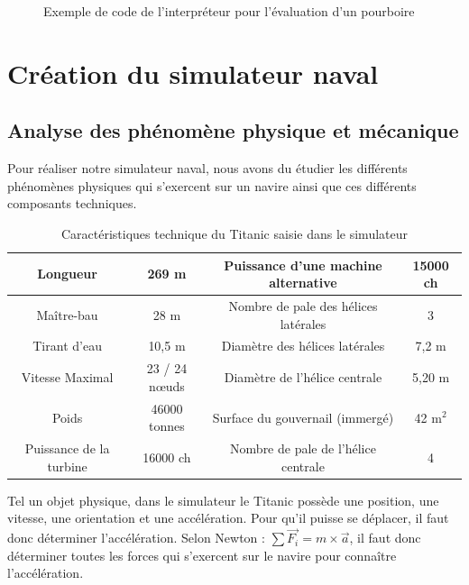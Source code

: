 \documentclass[a4paper,11pt]{article}
\begin{document}
    \begin{figure}[H]
        \begin{center}
            \caption{Exemple de code de l’interpréteur pour l’évaluation d'un pourboire}
            
            \label{fig:codeExemple}
        \end{center}
    \end{figure}

    \section{Création du simulateur naval}

    \subsection{Analyse des phénomène physique et mécanique}

    Pour réaliser notre simulateur naval, nous avons du étudier les différents phénomènes physiques qui s'exercent sur un navire ainsi que ces différents composants techniques.

    \begin{table}[H]
        \caption{Caractéristiques technique du Titanic saisie dans le simulateur}
        \label{tab:TitanicData}

        \begin{center}
            \begin{tabular}{|c|c||c|c|}
                \hline
                Longueur & 269 m & Puissance d'une machine alternative & 15000 ch \tabularnewline
                \hline
                Maître-bau & 28 m & Nombre de pale des hélices latérales & 3 \tabularnewline
                \hline
                Tirant d'eau & 10,5 m & Diamètre des hélices latérales & 7,2 m \tabularnewline
                \hline
                Vitesse Maximal & 23 / 24 nœuds & Diamètre de l'hélice centrale & 5,20 m \tabularnewline
                \hline
                Poids & 46000 tonnes & Surface du gouvernail (immergé) & 42 m$^{2}$ \tabularnewline
                \hline
                Puissance de la turbine & 16000 ch & Nombre de pale de l'hélice centrale & 4 \tabularnewline
                \hline
            \end{tabular}
        \end{center}
    \end{table}

    Tel un objet physique, dans le simulateur le Titanic possède une position, une vitesse, une orientation et une accélération. Pour qu'il puisse se déplacer, il faut donc déterminer l'accélération. Selon Newton : $\sum \overrightarrow{F_{i}} = m \times \overrightarrow{a}$, il faut donc déterminer toutes les forces qui s'exercent sur le navire pour connaître l’accélération.
\end{document}
